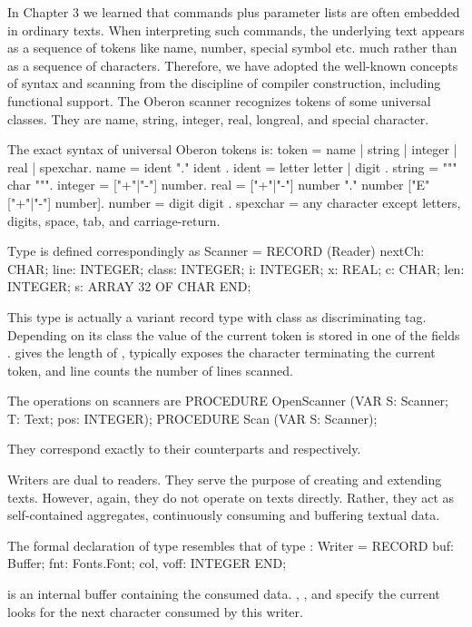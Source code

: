 \noindent In Chapter 3 we learned that commands plus parameter lists are often
embedded in ordinary texts. When interpreting such commands, the
underlying text appears as a sequence of tokens like name, number,
special symbol etc. much rather than as a sequence of
characters. Therefore, we have adopted the well-known concepts of
syntax and scanning from the discipline of compiler construction,
including functional support. The Oberon scanner recognizes tokens of
some universal classes. They are name, string, integer, real,
longreal, and special character.

The exact syntax of universal Oberon tokens is:
\begintt
token = name | string | integer | real | spexchar.
name = ident { "." ident }.
ident = letter { letter | digit }.
string = """ { char } """.
integer = ["+"|"-"] number.
real = ["+"|"-"] number "." number ["E" ["+"|"-"] number].
number = digit { digit }.
spexchar = any character except letters, digits, space, tab, and carriage-return.
\endtt

\noindent Type  is defined correspondingly as
\begintt
Scanner = RECORD (Reader)
  nextCh: CHAR;
  line: INTEGER;
  class: INTEGER;
  i: INTEGER;
  x: REAL;
  c: CHAR;
  len: INTEGER;
  s: ARRAY 32 OF CHAR
END;
\endtt

\noindent This type is actually a variant record type with class as
discriminating tag. Depending on its class the value of the current
token is stored in one of the fields .  gives the length of ,  typically exposes the character terminating the current token, and line counts the number of lines scanned.

The operations on scanners are
\begintt
PROCEDURE OpenScanner (VAR S: Scanner; T: Text; pos: INTEGER);
PROCEDURE Scan (VAR S: Scanner);
\endtt

\noindent They correspond exactly to their counterparts  and  respectively.

Writers are dual to readers. They serve the purpose of creating and
extending texts. However, again, they do not operate on texts
directly. Rather, they act as self-contained aggregates, continuously
consuming and buffering textual data.

The formal declaration of type  resembles that of type :
\begintt
Writer = RECORD buf:
  Buffer;
  fnt: Fonts.Font;
  col, voff: INTEGER
END;
\endtt

\noindent {} is an internal buffer containing the consumed data. , , and  specify the current looks for the next character consumed by this writer.

